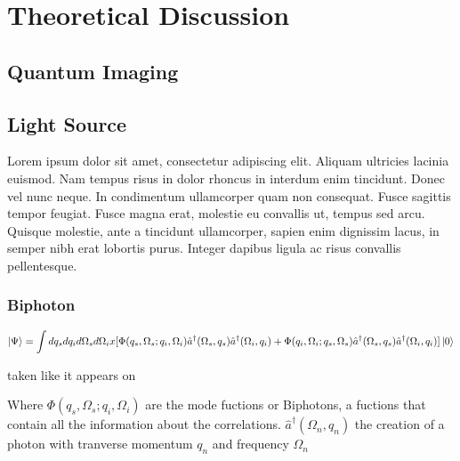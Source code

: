 
\chapter{Theoretical Discussion} %

\label{Chapter2} %


\section{Quantum Imaging}



\section{Light Source}

Lorem ipsum dolor sit amet, consectetur adipiscing elit. Aliquam ultricies lacinia euismod. Nam tempus risus in dolor rhoncus in interdum enim tincidunt. Donec vel nunc neque. In condimentum ullamcorper quam non consequat. Fusce sagittis tempor feugiat. Fusce magna erat, molestie eu convallis ut, tempus sed arcu. Quisque molestie, ante a tincidunt ullamcorper, sapien enim dignissim lacus, in semper nibh erat lobortis purus. Integer dapibus ligula ac risus convallis pellentesque.

\subsection{Biphoton}

\begin{equation}
\ket{\Psi}=\int dq_s dq_i d\Omega_s d\Omega_i 
x [\Phi(q_s,\Omega_s;q_i,\Omega_i) \hat{a}^{\dagger} (\Omega_s,q_s) \hat{a}^{\dagger}(\Omega_i,q_i) \\
+ \Phi(q_i,\Omega_i;q_s,\Omega_s) \hat{a}^{\dagger}(\Omega_s,q_s) \hat{a}^{\dagger}(\Omega_i,q_i)]   \ket{0}  
\end{equation}

taken like it appears on \cite{spatiocorrelations}

 Where $\Phi(q_s,\Omega_s;q_i,\Omega_i)$ are the mode fuctions or Biphotons, a fuctions that contain all the information about the correlations. $ \hat{a}^{\dagger}(\Omega_n,q_n)$ the creation of a photon with tranverse momentum $q_n$ and frequency $\Omega_n$

